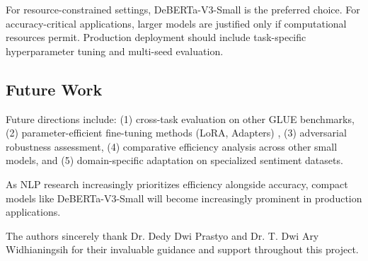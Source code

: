 \documentclass[pdflatex,sn-mathphys-num]{sn-jnl}
\theoremstyle{thmstyleone}%
\theoremstyle{thmstyletwo}%
\theoremstyle{thmstylethree}%
\begin{document}
For resource-constrained settings, DeBERTa-V3-Small is the preferred choice. For accuracy-critical applications, larger models are justified only if computational resources permit. Production deployment should include task-specific hyperparameter tuning and multi-seed evaluation.

\subsection{Future Work}

Future directions include: (1) cross-task evaluation on other GLUE benchmarks, (2) parameter-efficient fine-tuning methods (LoRA, Adapters) \cite{hu2021lora}, (3) adversarial robustness assessment, (4) comparative efficiency analysis across other small models, and (5) domain-specific adaptation on specialized sentiment datasets.

As NLP research increasingly prioritizes efficiency alongside accuracy, compact models like DeBERTa-V3-Small will become increasingly prominent in production applications.



\backmatter


The authors sincerely thank Dr. Dedy Dwi Prastyo and Dr. T. Dwi Ary Widhianingsih for their invaluable guidance and support throughout this project.



\end{document}
